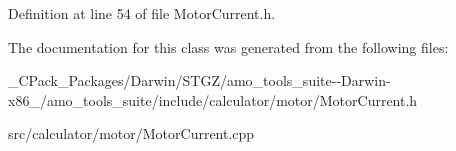 Definition at line 54 of file Motor\+Current.\+h.



The documentation for this class was generated from the following files\+:\begin{DoxyCompactItemize}
\item 
\+\_\+\+C\+Pack\+\_\+\+Packages/\+Darwin/\+S\+T\+G\+Z/amo\+\_\+tools\+\_\+suite-\/-\/\+Darwin-\/x86\+\_/amo\+\_\+tools\+\_\+suite/include/calculator/motor/Motor\+Current.\+h\item 
src/calculator/motor/Motor\+Current.\+cpp\end{DoxyCompactItemize}
